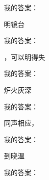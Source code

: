 \documentclass[12pt, a4paper, addpoints]{exam}
\begin{document}
\begin{multicols}{2}
\begin{questions}
我的答案：

\question[1] \uline{\qquad\qquad\qquad}明镜台

我的答案：

\question[1] \uline{\qquad\qquad\qquad}，可以明得失

我的答案：

\question[1] 炉火灰深\uline{\qquad\qquad\qquad}

我的答案：

\question[1] 同声相应，\uline{\qquad\qquad\qquad}

我的答案：

\question[1] \uline{\qquad\qquad\qquad}到晓温

我的答案：

\end{questions}
\end{multicols}
\end{document}
